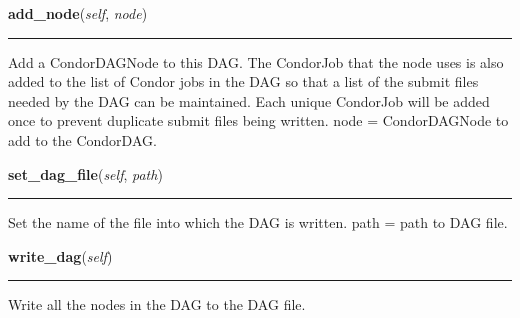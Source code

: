     \label{pipeline:CondorDAG:add_node}
    \vspace{0.5ex}

    \noindent\begin{boxedminipage}{\textwidth}

    \raggedright \textbf{add\_node}(\textit{self}, \textit{node})

    \vspace{-1.5ex}

    \rule{\textwidth}{0.5\fboxrule}
    Add a CondorDAGNode to this DAG. The CondorJob that the node uses is 
    also added to the list of Condor jobs in the DAG so that a list of 
    the submit files needed by the DAG can be maintained. Each unique 
    CondorJob will be added once to prevent duplicate submit files being 
    written. node = CondorDAGNode to add to the CondorDAG.

    \vspace{1ex}

    \end{boxedminipage}

    \label{pipeline:CondorDAG:set_dag_file}
    \vspace{0.5ex}

    \noindent\begin{boxedminipage}{\textwidth}

    \raggedright \textbf{set\_dag\_file}(\textit{self}, \textit{path})

    \vspace{-1.5ex}

    \rule{\textwidth}{0.5\fboxrule}
    Set the name of the file into which the DAG is written. path = path 
    to DAG file.

    \vspace{1ex}

    \end{boxedminipage}

    \label{pipeline:CondorDAG:write_dag}
    \vspace{0.5ex}

    \noindent\begin{boxedminipage}{\textwidth}

    \raggedright \textbf{write\_dag}(\textit{self})

    \vspace{-1.5ex}

    \rule{\textwidth}{0.5\fboxrule}
    Write all the nodes in the DAG to the DAG file.

    \vspace{1ex}

    \end{boxedminipage}

